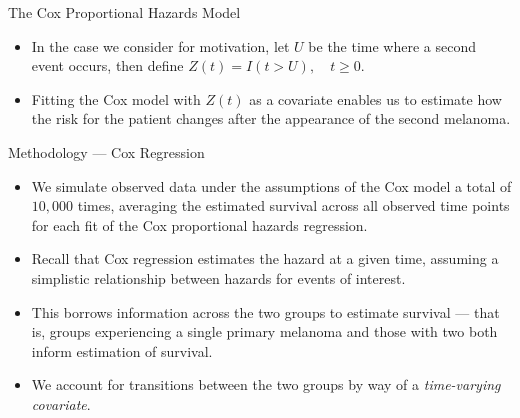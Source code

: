 \documentclass[12pt,t]{beamer}
\begin{document}

\begin{frame}[c]{The Cox Proportional Hazards Model}

\begin{center}
\begin{itemize}
  \itemsep12pt
  \item In the case we consider for motivation, let $U$ be the time where a
    second event occurs, then define $Z(t) = I(t > U), \quad t\geq 0.$
  \item Fitting the Cox model with $Z(t)$ as a covariate enables us to estimate
    how the risk for the patient changes after the appearance of the second
    melanoma.
\end{itemize}
\end{center}


\end{frame}


\begin{frame}[c]{Methodology --- Cox Regression}

\begin{center}
\begin{itemize}
  \itemsep12pt
  \item We simulate observed data under the assumptions of the Cox model a total
    of $10,000$ times, averaging the estimated survival across all observed time
    points for each fit of the Cox proportional hazards regression.
  \item Recall that Cox regression estimates the hazard at a given time,
    assuming a simplistic relationship between hazards for events of interest.
  \item This borrows information across the two groups to estimate survival ---
    that is, groups experiencing a single primary melanoma and those with two
    both inform estimation of survival.
  \item We account for transitions between the two groups by way of a
    \textit{time-varying covariate}.
\end{itemize}
\end{center}

\note{
}

\end{frame}
\end{document}
